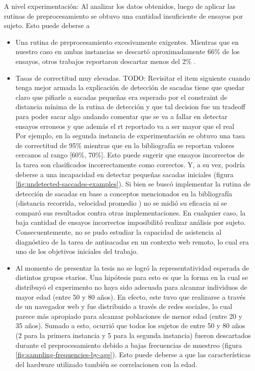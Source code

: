 A nivel experimentación: Al analizar los datos obtenidos, luego de aplicar las
rutinas de preprocesamiento se obtuvo una cantidad insuficiente de ensayos por
sujeto.
Esto puede deberse a 
\begin{itemize}
  \item Una rutina de preprocesamiento excesivamente exigentes.
  Mientras que en nuestro caso en ambas instancias se descartó aproximadamente
66\% de los ensayos, otros trabajos reportaron descartar menos del 2\%
\cite{unsworth_2011_distribution_analysis}. 

  \item Tasas de correctitud muy elevadas.
    TODO: Revisitar el item siguiente cuando tenga mejor armada la explicación
          de detección de sacadas
          tiene que quedar claro que pifiarle a sacadas pequeñas era esperado
          por el constraint de distancia mínima de la rutina de detección y que
          tal decision fue un tradeoff para poder sacar algo andando comentar
          que se va a fallar en detectar ensayos erroneos y que además el rt
          reportado va a ser mayor que el real \\
    Por ejemplo, en la segunda instancia de experimentación se obtuvo una tasa
    de correctitud de 95\% mientras que en la bibliografía se reportan valores
    cercanos al rango [60\%, 70\%].
    Esto puede sugerir que ensayos incorrectos de la tarea son clasificados
    incorrectamente como correctos.
    Y, a su vez, podría deberse a una incapacidad en detectar pequeñas sacadas
    iniciales (figura \ref{fig:undetected-saccades-examples}).
    Si bien se buscó implementar la rutina de detección de sacadas en base a
    conceptos mencionados en la bibliografía (distancia recorrida, velocidad
    promedio \cite{stuart_2019_saccade_detection_algorithms}) no se midió su
    eficacia ni se comparó sus resultados contra otras implementaciones.
    En cualquier caso, la baja cantidad de ensayos incorrectos imposibilitó
    realizar análisis por sujeto.
    Consecuentemente, no se pudo estudiar la capacidad de asistencia al
    diagnóstico de la tarea de antisacadas en un contexto web remoto, lo cual
    era uno de los objetivos iniciales del trabajo.

  \item Al momento de presentar la tesis no se logró la representatividad
esperada de distintos grupos etarios.
  Una hipótesis para esto es que la forma en la cual se distribuyó el
experimento no haya sido adecuada para alcanzar individuos de mayor edad (entre
50 y 80 años).
  En efecto, este tuvo que realizarse a través de un navegador web y fue
distribuido a través de redes sociales, lo cual parece más apropiado para
alcanzar poblaciones de menor edad (entre 20 y 35 años).
  Sumado a esto, ocurrió que todos los sujetos de entre 50 y 80 años (2 para la
primera instancia y 5 para la segunda instancia) fueron descartados durante el
preprocesamiento debido a bajas frecuencias de muestreo (figura
\ref{fig:sampling-frequencies-by-age}).
  Esto puede deberse a que las características del hardware utilizado también
se correlacionen con la edad.


\end{itemize}
